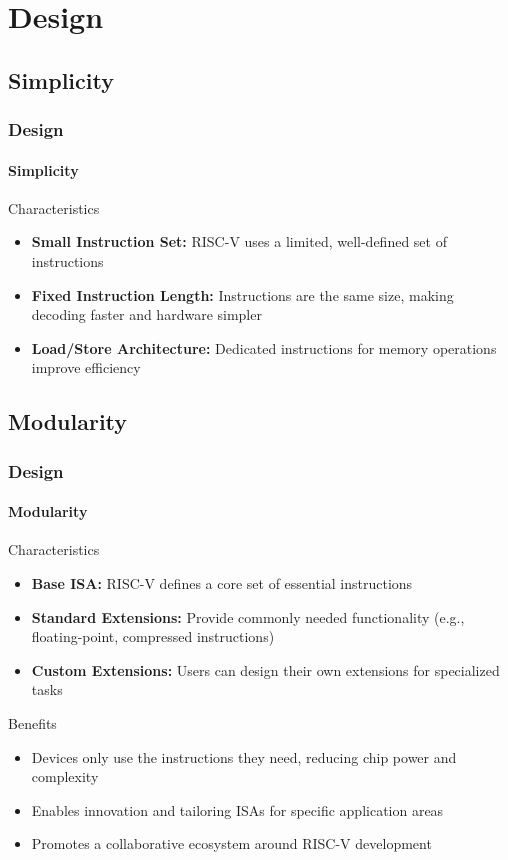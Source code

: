 \documentclass{beamer}
\begin{document}
	\section{Design}
	\subsection{Simplicity}
	\begin{frame}
		\frametitle{Design}
		\framesubtitle{Simplicity}
		
		\begin{alertblock}{Characteristics}
			\begin{itemize}
				\item \textbf{Small Instruction Set:} RISC-V uses a limited, well-defined set of instructions
				
				\item \textbf{Fixed Instruction Length:} Instructions are the same size, making decoding faster and hardware simpler
				
				\item \textbf{Load/Store Architecture:}  Dedicated instructions for memory operations improve efficiency
			\end{itemize}
		\end{alertblock}
	\end{frame}
	
	\subsection{Modularity}
	\begin{frame}
		\frametitle{Design}
		\framesubtitle{Modularity}
		
		\begin{alertblock}{Characteristics}
			\begin{itemize}
				\item \textbf{Base ISA:}  RISC-V defines a core set of essential instructions
				
				\item \textbf{Standard Extensions:}  Provide commonly needed functionality (e.g., floating-point, compressed instructions)
				
				\item \textbf{Custom Extensions:}  Users can design their own extensions for specialized tasks
			\end{itemize}
		\end{alertblock}
		
		\begin{alertblock}{Benefits}
		\begin{itemize}
			\item  Devices only use the instructions they need, reducing chip power and complexity
			
			\item  Enables innovation and tailoring ISAs for specific application areas
			
			\item  Promotes a collaborative ecosystem around RISC-V development
		\end{itemize}
		\end{alertblock}
	\end{frame}
	
\end{document}
